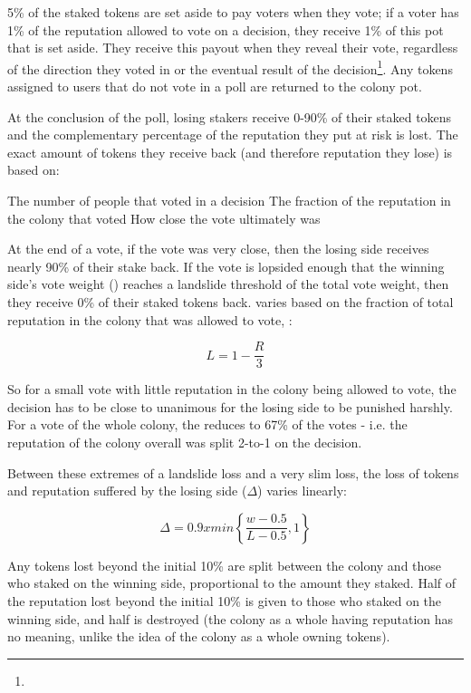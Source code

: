 5\% of the staked tokens are set aside to pay voters when they vote; if a voter has 1\% of the reputation allowed to vote on a decision, they receive 1\% of this pot that is set aside. They receive this payout when they reveal their vote, regardless of the direction they voted in or the eventual result of the decision\footnote{}. Any tokens assigned to users that do not vote in a poll are returned to the colony pot.

At the conclusion of the poll, losing stakers receive 0-90\% of their staked tokens and the complementary percentage of the reputation they put at risk is lost. The exact amount of tokens they receive back (and therefore reputation they lose) is based on:

The number of people that voted in a decision
The fraction of the reputation in the colony that voted
How close the vote ultimately was

At the end of a vote, if the vote was very close, then the losing side receives nearly 90\% of their stake back. If the vote is lopsided enough that the winning side’s vote weight () reaches a landslide threshold  of the total vote weight, then they receive 0\% of their staked tokens back.  varies based on the fraction of total reputation in the colony that was allowed to vote, :

\[
L = 1 - \frac{R}{3}
\]

So for a small vote with little reputation in the colony being allowed to vote, the decision has to be close to unanimous for the losing side to be punished harshly. For a vote of the whole colony, the  reduces to 67\% of the votes - i.e. the reputation of the colony overall was split 2-to-1 on the decision.

Between these extremes of a landslide loss and a very slim loss, the loss of tokens and reputation suffered by the losing side ($\Delta$) varies linearly:

\[
 \Delta = 0.9 x min \left\lbrace \frac{w-0.5}{L-0.5}, 1 \right\rbrace
\]


Any tokens lost beyond the initial 10\% are split between the colony and those who staked on the winning side, proportional to the amount they staked. Half of the reputation lost beyond the initial 10\% is given to those who staked on the winning side, and half is destroyed (the colony as a whole having reputation has no meaning, unlike the idea of the colony as a whole owning tokens).




